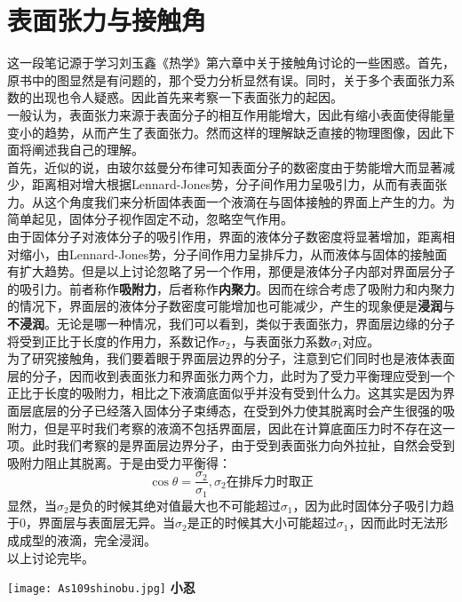 \documentclass[utf8]{ctexart}
\begin{document}
\section{表面张力与接触角}
\noindent 这一段笔记源于学习刘玉鑫《热学》第六章中关于接触角讨论的一些困惑。首先，原书中的图显然是有问题的，那个受力分析显然有误。同时，关于多个表面张力系数的出现也令人疑惑。因此首先来考察一下表面张力的起因。\\
一般认为，表面张力来源于表面分子的相互作用能增大，因此有缩小表面使得能量变小的趋势，从而产生了表面张力。然而这样的理解缺乏直接的物理图像，因此下面将阐述我自己的理解。\\
首先，近似的说，由玻尔兹曼分布律可知表面分子的数密度由于势能增大而显著减少，距离相对增大根据Lennard-Jones势，分子间作用力呈吸引力，从而有表面张力。从这个角度我们来分析固体表面一个液滴在与固体接触的界面上产生的力。为简单起见，固体分子视作固定不动，忽略空气作用。\\
由于固体分子对液体分子的吸引作用，界面的液体分子数密度将显著增加，距离相对缩小，由Lennard-Jones势，分子间作用力呈排斥力，从而液体与固体的接触面有扩大趋势。但是以上讨论忽略了另一个作用，那便是液体分子内部对界面层分子的吸引力。前者称作\textbf{吸附力}，后者称作\textbf{内聚力}。因而在综合考虑了吸附力和内聚力的情况下，界面层的液体分子数密度可能增加也可能减少，产生的现象便是\textbf{浸润}与\textbf{不浸润}。无论是哪一种情况，我们可以看到，类似于表面张力，界面层边缘的分子将受到正比于长度的作用力，系数记作$\sigma_2$，与表面张力系数$\sigma_1$对应。\\
为了研究接触角，我们要着眼于界面层边界的分子，注意到它们同时也是液体表面层的分子，因而收到表面张力和界面张力两个力，此时为了受力平衡理应受到一个正比于长度的吸附力，相比之下液滴底面似乎并没有受到什么力。这其实是因为界面层底层的分子已经落入固体分子束缚态，在受到外力使其脱离时会产生很强的吸附力，但是平时我们考察的液滴不包括界面层，因此在计算底面压力时不存在这一项。此时我们考察的是界面层边界分子，由于受到表面张力向外拉扯，自然会受到吸附力阻止其脱离。于是由受力平衡得：
$$
\cos\theta=\frac{\sigma_2}{\sigma_1},\sigma_2\text{在排斥力时取正}
$$
显然，当$\sigma_2$是负的时候其绝对值最大也不可能超过$\sigma_1$，因为此时固体分子吸引力趋于$0$，界面层与表面层无异。当$\sigma_2$是正的时候其大小可能超过$\sigma_1$，因而此时无法形成成型的液滴，完全浸润。\\
以上讨论完毕。
\begin{center}
	\texttt{[image: As109shinobu.jpg]}
	\textbf{小忍}
\end{center}
\end{document}

